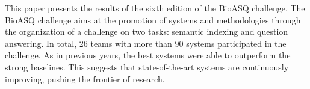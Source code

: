 This paper presents the results of the sixth edition of the BioASQ challenge. The BioASQ challenge aims at the promotion of systems and methodologies through the organization of a challenge on two tasks: semantic indexing and question answering. In total, 26 teams with more than 90 systems participated in the challenge. As in previous years, the best systems were able to outperform the strong baselines. This suggests that state-of-the-art systems are continuously improving, pushing the frontier of research.
